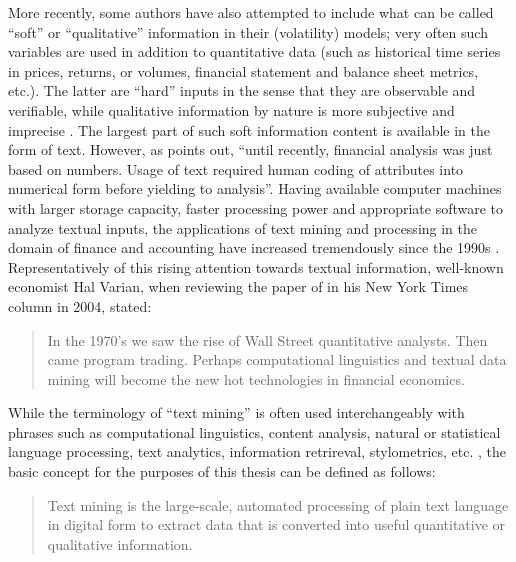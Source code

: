 More recently, some authors have also attempted to include what can be called \enquote{soft} or \enquote{qualitative} information in their (volatility) models; very often such variables are used in addition to quantitative data (such as historical time series in prices, returns, or volumes, financial statement and balance sheet metrics, etc.). The latter are \enquote{hard} inputs in the sense that they are observable and verifiable, while qualitative information by nature is more subjective and imprecise \parencite{LM-meta-2016}. The largest part of such soft information content is available in the form of text. However, as \textcite[146]{Das2014} points out, \enquote{until recently, financial analysis was just based on numbers. Usage of text required human coding of attributes into numerical form before yielding to analysis}. Having available computer machines with larger storage capacity, faster processing power and appropriate software to analyze textual inputs, the applications of text mining and processing in the domain of finance and accounting have increased tremendously since the 1990s \parencite{KumarRavi2016}. Representatively of this rising attention towards textual information, well-known economist Hal Varian, when reviewing the paper of \textcite{AntweilerFrank2004} in his New York Times column in 2004, stated: 
\blockquote[\textcite{Varian-NYT-2004}]{In the 1970's we saw the rise of Wall Street quantitative analysts. Then came program trading. Perhaps computational linguistics and textual data mining will become the new hot technologies in financial economics.}

While the terminology of \enquote{text mining} is often used interchangeably with phrases such as computational linguistics, content analysis, natural or statistical language processing, text analytics, information retrireval, stylometrics, etc. \parencite{LM-meta-2016}, the basic concept for the purposes of this thesis can be defined as follows: 
\blockquote[\textcite{Das2014}]{Text mining is the large-scale, automated processing of plain text language in digital form to extract data that is converted into useful quantitative or qualitative information.}

